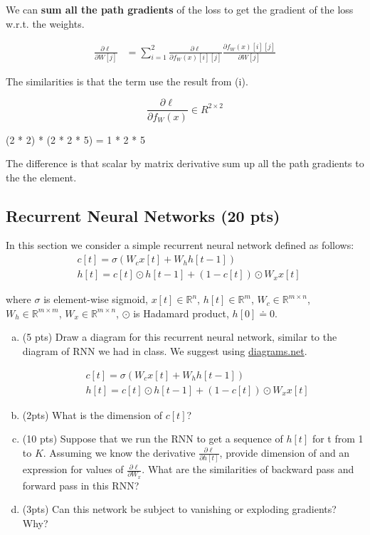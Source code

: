 \begin{enumerate}[(a)]
We can \textbf{sum all the path gradients} of the loss to get the gradient of the loss w.r.t. the weights.

\begin{align}
    \frac{\partial \ell}{\partial W[j]} 
    &=\sum_{i=1}^{2} \frac{\partial \ell}{\partial f_W(x)[i][j]} \frac{\partial f_W(x)[i][j]}{\partial W[j]}
\end{align}


The similarities is that the term use the result from (i).

$$\frac{\partial \ell}{\partial f_W(x)} \in R^{2\times2} $$

(2 * 2) * (2 * 2 * 5) = 1 * 2 * 5

The difference is that scalar by matrix derivative sum up all the path gradients to the the element.



\end{enumerate}

\subsection{Recurrent Neural Networks (20 pts) }

In this section we consider a simple recurrent neural network defined as follows:
\begin{align}
&c[t] = \sigma(W_c x[t] + W_h h[t - 1]) \\
&h[t] = c[t] \odot h[{t-1}] + (1-c[t]) \odot W_x x[t]
\end{align}

where $\sigma$ is element-wise sigmoid, $x[t] \in \mathbb{R}^n$, $h[t] \in \mathbb{R}^m$, $W_c \in \mathbb{R}^{m \times n}$,  $W_h \in \mathbb{R}^{m \times m}$, $W_x \in \mathbb{R}^{m \times n}$, $\odot$ is Hadamard product, $h[0] \doteq 0$.

\begin{enumerate}[(a)]
\item (5 pts) Draw a diagram for this recurrent neural network, similar to the diagram of RNN we had in class. We suggest using \href{http://www.diagrams.net}{diagrams.net}.

\begin{align}
    &c[t] = \sigma(W_c x[t] + W_h h[t - 1]) \\
    &h[t] = c[t] \odot h[{t-1}] + (1-c[t]) \odot W_x x[t]
\end{align}


\item (2pts) What is the dimension of $c[t]$?


\item (10 pts) Suppose that we run the RNN to get a sequence of $h[t]$ for t from 1 to $K$. Assuming we know the derivative $\frac{\partial \ell}{\partial h[t]}$, provide dimension of and an expression for values of $\frac{\partial \ell}{\partial W_x}$. What are the similarities of backward pass and forward pass in this RNN?


\item (3pts) Can this network be subject to vanishing or exploding gradients? Why?

\end{enumerate}

